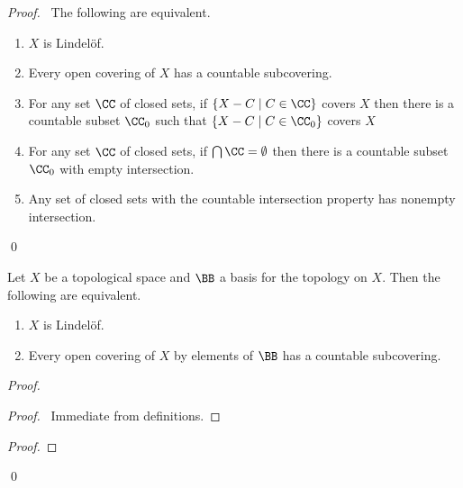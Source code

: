 \begin{proof}
    \pf\ The following are equivalent.
    \begin{enumerate}
        \item $X$ is Lindel\"{o}f.
        \item Every open covering of $X$ has a countable subcovering.
        \item For any set $\CC$ of closed sets, if $\{ X - C \mid C \in \CC \}$ covers $X$ then there is a countable subset $\CC_0$ such that
        $\{ X - C \mid C \in \CC_0 \}$ covers $X$
        \item For any set $\CC$ of closed sets, if $\bigcap \CC = \emptyset$ then there is a countable subset $\CC_0$ with empty intersection.
        \item Any set of closed sets with the countable intersection property has nonempty intersection.
    \end{enumerate}
    \qed
\end{proof}

\begin{proposition}[CC]
    \label{proposition:lindelof_basis}
    Let $X$ be a topological space and $\BB$ a basis for the topology on $X$.
    Then the following are equivalent.
    \begin{enumerate}
        \item $X$ is Lindel\"{o}f.
        \item Every open covering of $X$ by elements of $\BB$ has a countable subcovering.
    \end{enumerate}
\end{proposition}

\begin{proof}
    \pf
    \begin{proof}
        \pf\ Immediate from definitions.
    \end{proof}
    \begin{proof}
    \end{proof}
    \qed
\end{proof}

